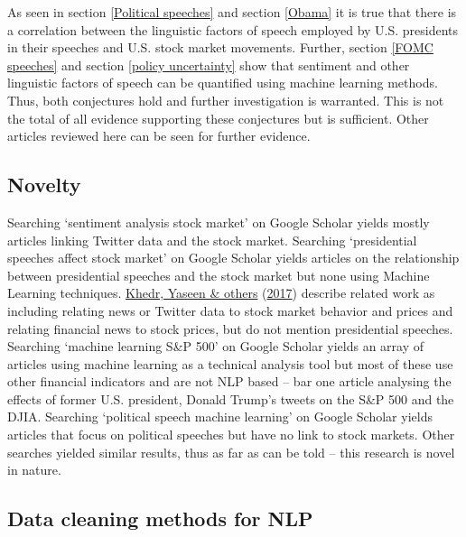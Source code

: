 \documentclass[11pt,preprint, authoryear]{elsarticle}
\numberwithin{equation}{section}
\numberwithin{figure}{section}
\numberwithin{table}{section}
\begin{document}
As seen in section \ref{Political speeches} and section \ref{Obama} it
is true that there is a correlation between the linguistic factors of
speech employed by U.S. presidents in their speeches and U.S. stock
market movements. Further, section \ref{FOMC speeches} and section
\ref{policy uncertainty} show that sentiment and other linguistic
factors of speech can be quantified using machine learning methods.
Thus, both conjectures hold and further investigation is warranted. This
is not the total of all evidence supporting these conjectures but is
sufficient. Other articles reviewed here can be seen for further
evidence.

\hypertarget{novelty}{%
\subsection{\texorpdfstring{Novelty
\label{novelty}}{Novelty }}\label{novelty}}

Searching `sentiment analysis stock market' on Google Scholar yields
mostly articles linking Twitter data and the stock market. Searching
`presidential speeches affect stock market' on Google Scholar yields
articles on the relationship between presidential speeches and the stock
market but none using Machine Learning techniques.
\protect\hyperlink{ref-khedr2017predicting}{Khedr, Yaseen \& others}
(\protect\hyperlink{ref-khedr2017predicting}{2017}) describe related
work as including relating news or Twitter data to stock market behavior
and prices and relating financial news to stock prices, but do not
mention presidential speeches. Searching `machine learning S\&P 500' on
Google Scholar yields an array of articles using machine learning as a
technical analysis tool but most of these use other financial indicators
and are not NLP based -- bar one article analysing the effects of former
U.S. president, Donald Trump's tweets on the S\&P 500 and the DJIA.
Searching `political speech machine learning' on Google Scholar yields
articles that focus on political speeches but have no link to stock
markets. Other searches yielded similar results, thus as far as can be
told -- this research is novel in nature.

\hypertarget{data-cleaning-methods-for-nlp}{%
\subsection{\texorpdfstring{Data cleaning methods for NLP
\label{data cleaning}}{Data cleaning methods for NLP }}\label{data-cleaning-methods-for-nlp}}
\end{document}
